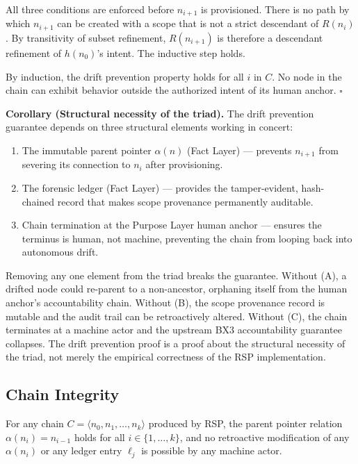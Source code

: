 All three conditions are enforced before $n_{i+1}$ is provisioned. There is no path by which $n_{i+1}$ can be created with a scope that is not a strict descendant of $R(n_i)$. By transitivity of subset refinement, $R(n_{i+1})$ is therefore a descendant refinement of $h(n_0)$'s intent. The inductive step holds.

By induction, the drift prevention property holds for all $i$ in $C$. No node in the chain can exhibit behavior outside the authorized intent of its human anchor. $\square$

\medskip\noindent\textbf{Corollary (Structural necessity of the triad).} The drift prevention guarantee depends on three structural elements working in concert:

\begin{enumerate}
  \item[(A)] The immutable parent pointer $\alpha(n)$ (Fact Layer) --- prevents $n_{i+1}$ from severing its connection to $n_i$ after provisioning.
  \item[(B)] The forensic ledger (Fact Layer) --- provides the tamper-evident, hash-chained record that makes scope provenance permanently auditable.
  \item[(C)] Chain termination at the Purpose Layer human anchor --- ensures the terminus is human, not machine, preventing the chain from looping back into autonomous drift.
\end{enumerate}

Removing any one element from the triad breaks the guarantee. Without (A), a drifted node could re-parent to a non-ancestor, orphaning itself from the human anchor's accountability chain. Without (B), the scope provenance record is mutable and the audit trail can be retroactively altered. Without (C), the chain terminates at a machine actor and the upstream BX3 accountability guarantee collapses. The drift prevention proof is a proof about the structural necessity of the triad, not merely the empirical correctness of the RSP implementation.

\subsection{Chain Integrity}
\label{sec:rs-chain-integrity}

\begin{thrm}
\label{thrm:chain-integrity}
For any chain $C = \langle n_0, n_1, \ldots, n_k \rangle$ produced by RSP, the parent pointer relation $\alpha(n_i) = n_{i-1}$ holds for all $i \in \{1, \ldots, k\}$, and no retroactive modification of any $\alpha(n_i)$ or any ledger entry $\ell_j$ is possible by any machine actor.
\end{thrm}

